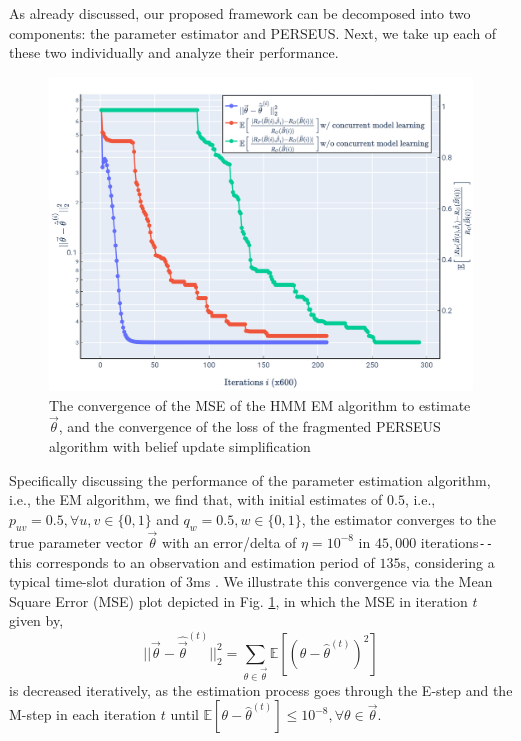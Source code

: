 \documentclass[12pt, draftcls, onecolumn]{IEEEtran}
\begin{document}
As already discussed, our proposed framework can be decomposed into two components: the parameter estimator and PERSEUS. Next, we take up each of these two individually and analyze their performance.
\begin{figure} [htb]
    \centerline{
    \includegraphics[width = 0.8\linewidth]{HMM_EM_Speed_Up.PNG}}
    \caption{The convergence of the MSE of the HMM EM algorithm to estimate $\vec{\theta}$, and the convergence of the loss of the fragmented PERSEUS algorithm with belief update simplification}
    \label{Fig. 7}
\end{figure}

Specifically discussing the performance of the parameter estimation algorithm, i.e., the EM algorithm, we find that, with initial estimates of $0.5$, i.e., $p_{uv}{=}0.5,{\forall}u,v{\in}\{0,1\}$ and $q_{w}{=}0.5,w{\in}\{0,1\}$, the estimator converges to the true parameter vector $\vec{\theta}$ with an error/delta of $\eta{=}10^{-8}$ in $45,000$ iterations\texttt{-{}-}this corresponds to an observation and estimation period of $135$s, considering a typical time-slot duration of $3$ms . We illustrate this convergence via the Mean Square Error (MSE) plot depicted in Fig. \ref{Fig. 7}, in which the MSE in iteration $t$ given by,
\begin{equation}\label{32}
    ||\vec{\theta}-\hat{\vec{\theta}}^{(t)}||_{2}^{2}=\sum_{\theta \in \vec{\theta}}\mathbb{E}[(\theta-\hat{\theta}^{(t)})^{2}]
\end{equation}
is decreased iteratively, as the estimation process goes through the E-step and the M-step in each iteration $t$ until $\mathbb{E}[\theta{-}\hat{\theta}^{(t)}]{\leq}10^{-8},{\forall}\theta{\in}\vec{\theta}$.
\end{document}
